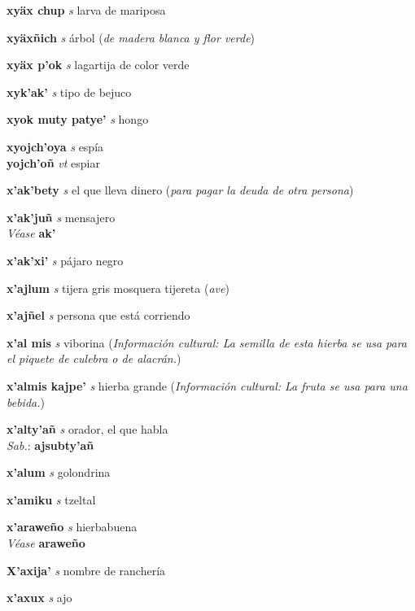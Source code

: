 \documentclass[10pt]{scrbook}
\newcommand{\entry}[1]{\textbf{#1}}
\newcommand{\alphaletter}[1]{\end{multicols}\addsec{#1}\begin{multicols}{2}}
\newcommand{\partofspeech}[1]{\textit{#1}}
\newcommand{\spanishtranslation}[1]{#1}
\newcommand{\clarification}[1]{(\textit{#1})}
\newcommand{\dialectvariant}[1]{\\\textit{#1}:}
\newcommand{\dialectword}[1]{\textbf{#1}}
\newcommand{\alsosee}[1]{\\\textit{Véase} \textbf{#1}}
\newcommand{\culturalinformation}[1]{(\textit{#1})}
\newcommand{\secondaryentry}[1]{\\\textbf{#1}}
\newcommand{\secondpartofspeech}[1]{\textit{#1}}
\newcommand{\secondtranslation}[1]{#1}
\begin{document}
\begin{multicols}{2}
\entry{xyäx chup}
\partofspeech{s}
\spanishtranslation{larva de mariposa}

\entry{xyäxñich}
\partofspeech{s}
\spanishtranslation{árbol}
\clarification{de madera blanca y flor verde}

\entry{xyäx p'ok}
\partofspeech{s}
\spanishtranslation{lagartija de color verde}

\entry{xyk'ak'}
\partofspeech{s}
\spanishtranslation{tipo de bejuco}

\entry{xyok muty patye'}
\partofspeech{s}
\spanishtranslation{hongo}

\entry{xyojch'oya}
\partofspeech{s}
\spanishtranslation{espía}
\secondaryentry{yojch'oñ}
\secondpartofspeech{vt}
\secondtranslation{espiar}

\alphaletter{X'}

\entry{x'ak'bety}
\partofspeech{s}
\spanishtranslation{el que lleva dinero}
\clarification{para pagar la deuda de otra persona}

\entry{x'ak'juñ}
\partofspeech{s}
\spanishtranslation{mensajero}
\alsosee{ak'}

\entry{x'ak'xi'}
\partofspeech{s}
\spanishtranslation{pájaro negro}

\entry{x'ajlum}
\partofspeech{s}
\spanishtranslation{tijera gris}
\spanishtranslation{mosquera tijereta}
\clarification{ave}

\entry{x'ajñel}
\partofspeech{s}
\spanishtranslation{persona que está corriendo}

\entry{x'al mis}
\partofspeech{s}
\spanishtranslation{viborina}
\culturalinformation{Información cultural: La semilla de esta hierba se usa para el piquete de culebra o de alacrán.}

\entry{x'almis kajpe'}
\partofspeech{s}
\spanishtranslation{hierba grande}
\culturalinformation{Información cultural: La fruta se usa para una bebida.}

\entry{x'alty'añ}
\partofspeech{s}
\spanishtranslation{orador, el que habla}
\dialectvariant{Sab.}
\dialectword{ajsubty'añ}

\entry{x'alum}
\partofspeech{s}
\spanishtranslation{golondrina}

\entry{x'amiku}
\partofspeech{s}
\spanishtranslation{tzeltal}

\entry{x'araweño}
\partofspeech{s}
\spanishtranslation{hierbabuena}
\alsosee{araweño}

\entry{X'axija'}
\partofspeech{s}
\spanishtranslation{nombre de ranchería}

\entry{x'axux}
\partofspeech{s}
\spanishtranslation{ajo}


\end{multicols}
\end{document}
